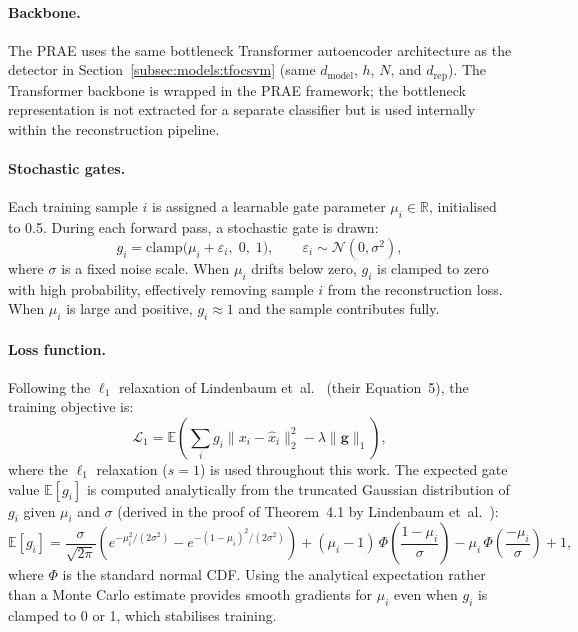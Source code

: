 \documentclass[11pt]{report}
\begin{document}
\paragraph{Backbone.}
The PRAE uses the same bottleneck Transformer autoencoder architecture as the detector in Section~\ref{subsec:models:tfocsvm} (same $d_{\text{model}}$, $h$, $N$, and $d_{\text{rep}}$). The Transformer backbone is wrapped in the PRAE framework; the bottleneck representation is not extracted for a separate classifier but is used internally within the reconstruction pipeline.

\paragraph{Stochastic gates.}
Each training sample $i$ is assigned a learnable gate parameter $\mu_i \in \mathbb{R}$, initialised to 0.5. During each forward pass, a stochastic gate is drawn:
\begin{equation}
  \label{eq:prae_gate}
  g_i = \mathrm{clamp}\!\bigl(\mu_i + \varepsilon_i,\; 0,\; 1\bigr), \qquad \varepsilon_i \sim \mathcal{N}(0, \sigma^2),
\end{equation}
where $\sigma$ is a fixed noise scale. When $\mu_i$ drifts below zero, $g_i$ is clamped to zero with high probability, effectively removing sample $i$ from the reconstruction loss. When $\mu_i$ is large and positive, $g_i \approx 1$ and the sample contributes fully.

\paragraph{Loss function.}
Following the $\ell_1$ relaxation of Lindenbaum et~al.~\cite{lindenbaum2022prae} (their Equation~5), the training objective is:
\begin{equation}
  \label{eq:prae_loss}
  \mathcal{L}_{1} = \mathbb{E} \left( \sum_i g_i \|x_i - \hat{x}_i \|_2^2 - \lambda \|\mathbf{g}\|_1\right),
\end{equation}
where the $\ell_1$ relaxation ($s = 1$) is used throughout this work. The expected gate value $\mathbb{E}[g_i]$ is computed analytically from the truncated Gaussian distribution of $g_i$ given $\mu_i$ and $\sigma$ (derived in the proof of Theorem~4.1 by Lindenbaum et~al.~\cite{lindenbaum2022prae}):
\begin{equation}
  \label{eq:expected_gate}
  \mathbb{E}[g_i] = \frac{\sigma}{\sqrt{2\pi}}\left(e^{-\mu_i^2/(2\sigma^2)} - e^{-(1-\mu_i)^2/(2\sigma^2)}\right) + (\mu_i - 1)\,\Phi\!\left(\frac{1-\mu_i}{\sigma}\right) - \mu_i\, \Phi\!\left(\frac{-\mu_i}{\sigma}\right) + 1,
\end{equation}
where $\Phi$ is the standard normal CDF. Using the analytical expectation rather than a Monte Carlo estimate provides smooth gradients for $\mu_i$ even when $g_i$ is clamped to 0 or 1, which stabilises training.
\end{document}
